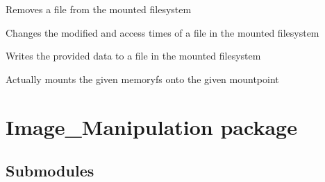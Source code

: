 \documentclass[letterpaper,12pt,openany,oneside]{sphinxmanual}
\begin{document}
\begin{fulllineitems}
\begin{fulllineitems}
\label{File_System:covertFS.File_System.memfuse.MemFS.unlink}
Removes a file from the mounted filesystem

\end{fulllineitems}


\begin{fulllineitems}
\label{File_System:covertFS.File_System.memfuse.MemFS.utimens}
Changes the modified and access times of a file in the mounted filesystem

\end{fulllineitems}


\begin{fulllineitems}
\label{File_System:covertFS.File_System.memfuse.MemFS.write}
Writes the provided data to a file in the mounted filesystem

\end{fulllineitems}


\end{fulllineitems}


\begin{fulllineitems}
\label{File_System:covertFS.File_System.memfuse.mount}
Actually mounts the given memoryfs onto the given mountpoint

\end{fulllineitems}



\section{Image\_Manipulation package}
\label{Image_Manipulation:image-manipulation-package}\label{Image_Manipulation::doc}

\subsection{Submodules}
\label{Image_Manipulation:submodules}
\end{document}
